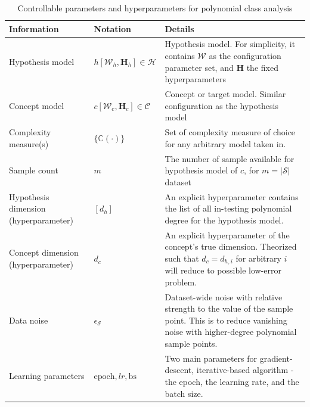 \begin{table}
  \centering
  \footnotesize
  \begin{threeparttable}
    \caption{Controllable parameters and hyperparameters for polynomial class analysis}
    \label{tab:polynomial_test}
    \begin{tabularx}{\textwidth}{ L{0.25\textwidth}
                                     L{0.2\textwidth}
                                     >{\RaggedRight\arraybackslash}X }
      \toprule
      \textbf{Information} & \textbf{Notation} & \textbf{Details} \\
      \midrule
      Hypothesis model
        & $h[\mathcal{W}_{h},\mathbf{H}_{h}]\in \mathcal{H}$
        & Hypothesis model. For simplicity, it contains $\mathcal{W}$ as the configuration parameter set, and $\mathbf{H}$ the fixed hyperparameters \\
      \addlinespace[1pt]
      Concept model
        & $c[\mathcal{W}_{c},\mathbf{H}_{c}]\in \mathcal{C}$
        & Concept or target model. Similar configuration as the hypothesis model \\
      \addlinespace[1pt]
      Complexity measure(s)
        & $\{\mathbb{C}(\cdot)\}$
        & Set of complexity measure of choice for any arbitrary model taken in. \\
      \addlinespace[1pt]
      Sample count
        & $m$
        & The number of sample available for hypothesis model of $c$, for $m=|\mathcal{S}|$ dataset\\
      \addlinespace[1pt]
      Hypothesis dimension (hyperparameter)
        & $[d_{h}]$
        & An explicit hyperparameter contains the list of all in-testing polynomial degree for the hypothesis model. \\
      \addlinespace[1pt]
      Concept dimension (hyperparameter)
        & $d_{c}$
        & An explicit hyperparameter of the concept's true dimension. Theorized such that $d_{c}=d_{h,i}$ for arbitrary $i$ will reduce to possible low-error problem.\\
      \addlinespace[1pt]
      Data noise
        & $\epsilon_{\mathcal{S}}$
        & Dataset-wide noise with relative strength to the value of the sample point. This is to reduce vanishing noise with higher-degree polynomial sample points. \\
      \addlinespace[1pt]
      Learning parameters
        & $\mathrm{epoch}, lr, \mathrm{bs}$
        & Two main parameters for gradient-descent, iterative-based algorithm - the epoch, the learning rate, and the batch size.\\
      \bottomrule
    \end{tabularx}


\end{threeparttable}
\end{table}

